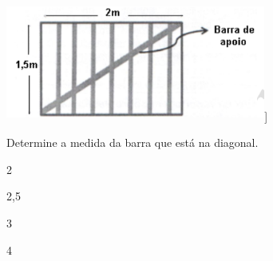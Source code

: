 \begin{escolha}
\begin{boxmedio}
\begin{boxmedio}
{\begin{boxpeq}
\begin{boxpeq}
{\begin{boxpeq}
\begin{boxmedio}
\begin{boxmedio}
\begin{boxpeq}
\begin{boxmedio}
\begin{boxpeq}
\begin{boxpeq}
\begin{boxpeq}
\begin{boxpeq}
\begin{boxmedio}
{\begin{boxmedio}
\begin{boxmedio}
\begin{boxpeq}
\begin{boxmedio}
\begin{boxpeq}
\begin{boxpeq}
\begin{boxpeq}
\begin{escolha}
{\begin{boxmedio}
\begin{boxpeq}
\begin{boxpeq}
\begin{boxpeq}
\begin{boxpeq}
\begin{boxpeq}
\begin{boxmedio}
\begin{boxpeq}
\begin{boxpeq}
\begin{boxpeq}
{\begin{boxpeq}
\begin{boxmedio}
\begin{boxpeq}
\begin{boxpeq}
\begin{boxpeq}
{\begin{boxpeq}
\begin{boxmedio}
{\begin{boxpeq}
\begin{boxpeq}
\begin{boxmedio}
\begin{boxmedio}
\begin{boxpeq}
\begin{boxpeq}
{\begin{boxpeq}
\begin{boxpeq}
\begin{boxpeq}
\begin{boxpeq}
\begin{boxpeq}
\begin{escolha}
\begin{escolha}
{\begin{boxmedio}
\begin{boxpeq}
\begin{q°}
\begin{boxmedio}
\begin{boxpeq}
\begin{boxpeq}
\begin{boxmedio}
\begin{boxmedio}
\begin{boxmedio}
\includegraphics[width=3.36667in,height=1.51667in]{./_SAEB_9_MAT/media/image192.png}{]}


Determine a medida da barra que está na diagonal.

\begin{escolha}

  \item 2

  \item 2,5
  
  \item 3
  
  \item 4

\end{escolha}

\end{boxmedio}
\end{boxmedio}
\end{boxmedio}
\end{boxpeq}
\end{boxpeq}
\end{boxmedio}
\end{q°}
\end{boxpeq}
\end{boxmedio}}
\end{escolha}
\end{escolha}
\end{boxpeq}
\end{boxpeq}
\end{boxpeq}
\end{boxpeq}
\end{boxpeq}}
\end{boxpeq}
\end{boxpeq}
\end{boxmedio}
\end{boxmedio}
\end{boxpeq}
\end{boxpeq}}
\end{boxmedio}
\end{boxpeq}}
\end{boxpeq}
\end{boxpeq}
\end{boxpeq}
\end{boxmedio}
\end{boxpeq}}
\end{boxpeq}
\end{boxpeq}
\end{boxpeq}
\end{boxmedio}
\end{boxpeq}
\end{boxpeq}
\end{boxpeq}
\end{boxpeq}
\end{boxpeq}
\end{boxmedio}}
\end{escolha}
\end{boxpeq}
\end{boxpeq}
\end{boxpeq}
\end{boxmedio}
\end{boxpeq}
\end{boxmedio}
\end{boxmedio}}
\end{boxmedio}
\end{boxpeq}
\end{boxpeq}
\end{boxpeq}
\end{boxpeq}
\end{boxmedio}
\end{boxpeq}
\end{boxmedio}
\end{boxmedio}
\end{boxpeq}}
\end{boxpeq}
\end{boxpeq}}
\end{boxmedio}
\end{boxmedio}
\end{escolha}
